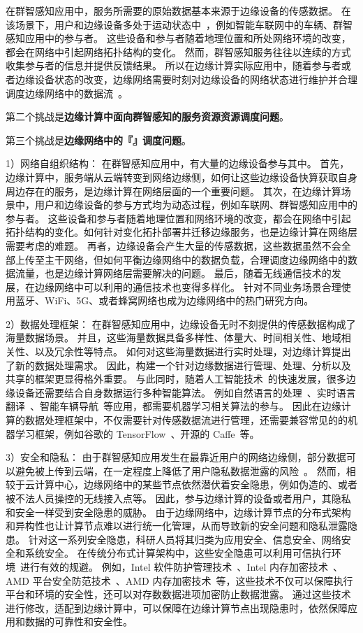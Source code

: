 在群智感知应用中，服务所需要的原始数据基本来源于边缘设备的传感数据。
在该场景下，用户和边缘设备多处于运动状态中~\cite{}，例如智能车联网中的车辆、群智感知应用中的参与者。
这些设备和参与者随着地理位置和所处网络环境的改变，都会在网络中引起网络拓扑结构的变化。
然而，群智感知服务往往以连续的方式收集参与者的信息并提供反馈结果。
所以在边缘计算实际应用中，随着参与者或者边缘设备状态的改变，边缘网络需要时刻对边缘设备的网络状态进行维护并合理调度边缘网络中的数据流~\cite{}。



第二个挑战是\textbf{边缘计算中面向群智感知的服务资源资源调度问题}。

第三个挑战是\textbf{边缘网络中的『』调度问题}。


1）网络自组织结构：
在群智感知应用中，有大量的边缘设备参与其中。
首先， 边缘计算中，服务端从云端转变到网络边缘侧，如何让这些边缘设备快算获取自身周边存在的服务，是边缘计算在网络层面的一个重要问题。
其次，在边缘计算场景中，用户和边缘设备的参与方式均为动态过程，例如车联网、群智感知应用中的参与者。
这些设备和参与者随着地理位置和网络环境的改变，都会在网络中引起拓扑结构的变化。如何针对变化拓扑部署并迁移边缘服务，也是边缘计算在网络层需要考虑的难题。
再者，边缘设备会产生大量的传感数据，这些数据虽然不会全部上传至主干网络，但如何平衡边缘网络中的数据负载，合理调度边缘网络中的数据流量，也是边缘计算网络层需要解决的问题。
最后，随着无线通信技术的发展，在边缘网络中可以利用的通信技术也变得多样化。
针对不同业务场景合理使用蓝牙、WiFi、5G、或者蜂窝网络也成为边缘网络中的热门研究方向。

2）数据处理框架：
在群智感知应用中，边缘设备无时不刻提供的传感数据构成了海量数据场景。
并且，这些海量数据具备多样性、体量大、时间相关性、地域相关性、以及冗余性等特点。
如何对这些海量数据进行实时处理，对边缘计算提出了新的数据处理需求。
因此，构建一个针对边缘数据进行管理、处理、分析以及共享的框架更显得格外重要。
与此同时，随着人工智能技术~\cite{}的快速发展，很多边缘设备还需要结合自身数据运行多种智能算法。
例如自然语言的处理~\cite{}、实时语言翻译~\cite{}、智能车辆导航~\cite{}等应用，都需要机器学习相关算法的参与。
因此在边缘计算的数据处理框架中，不仅需要针对传感数据流进行管理，还需要兼容常见的的机器学习框架，例如谷歌的 TensorFlow~\cite{}、开源的 Caffe~\cite{}等。

3）安全和隐私：
由于群智感知应用发生在最靠近用户的网络边缘侧，部分数据可以避免被上传到云端，在一定程度上降低了用户隐私数据泄露的风险~\cite{DBLP:conf/wasa/YiQL15}。
然而，相较于云计算中心，边缘网络中的某些节点依然潜伏着安全隐患，例如伪造的、或者被不法人员操控的无线接入点等。
因此，参与边缘计算的设备或者用户，其隐私和安全一样受到安全隐患的威胁。
由于边缘网络中，边缘计算节点的分布式架构和异构性也让计算节点难以进行统一化管理，从而导致新的安全问题和隐私泄露隐患。
针对这一系列安全隐患，科研人员将其归类为应用安全、信息安全、网络安全和系统安全。
在传统分布式计算架构中，这些安全隐患可以利用可信执行环境~\cite{DBLP:conf/trustcom/SabtAB15,DBLP:conf/isca/NingZSS17}进行有效的规避。
例如，Intel 软件防护管理技术~\cite{DBLP:conf/isca/HoekstraLPPC13}、Intel 内存加密技术~\cite{}、AMD 平台安全防范技术~\cite{}、AMD 内存加密技术~\cite{}等，这些技术不仅可以保障执行平台和环境的安全性，还可以对存数数据进项加密防止数据泄露。
通过这些技术进行修改，适配到边缘计算中，可以保障在边缘计算节点出现隐患时，依然保障应用和数据的可靠性和安全性。

